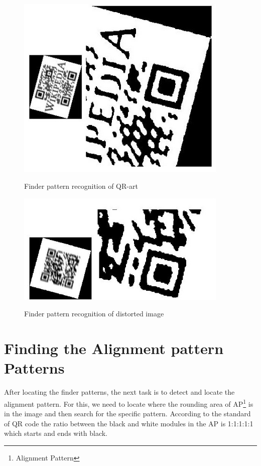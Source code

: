\begin{figure}[H]
  \caption{Finder pattern recognition of QR-art}
  \centering
    \includegraphics[width=0.9\textwidth]{figures/finderpattern2.jpg}
    \label{fig:3.3}
\end{figure}

\begin{figure}[H]
  \caption{Finder pattern recognition of distorted image}
  \centering
    \includegraphics[width=0.9\textwidth]{figures/finderpattern3.jpg}
    \label{fig:3.4}
\end{figure}

\section{Finding the Alignment pattern Patterns}

After locating the finder patterns, the next task is to detect and locate the alignment pattern. For
this, we need to locate where the rounding area of AP\footnote{Alignment Pattern} is in the image and then search for the specific pattern. According to the standard of QR code \cite{1iso} the ratio between the black and white modules in the
AP is 1:1:1:1:1 which starts and ends with black. 

